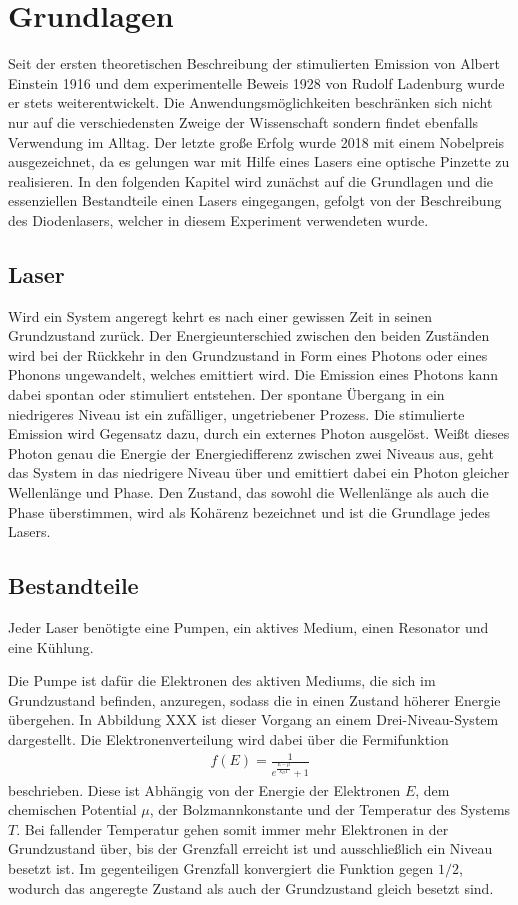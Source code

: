 \section{Grundlagen}
\label{sec:Grundlagen}
Seit der ersten theoretischen Beschreibung der stimulierten Emission von Albert Einstein 1916 und dem experimentelle Beweis 1928 von Rudolf Ladenburg wurde er stets weiterentwickelt. Die Anwendungsmöglichkeiten beschränken sich nicht nur auf die verschiedensten Zweige der Wissenschaft sondern findet ebenfalls Verwendung im Alltag. Der letzte große Erfolg wurde 2018 mit einem Nobelpreis ausgezeichnet, da es gelungen war mit Hilfe eines Lasers eine optische Pinzette zu realisieren.
In den folgenden Kapitel wird zunächst auf die Grundlagen und die essenziellen Bestandteile einen Lasers eingegangen, gefolgt von der Beschreibung des Diodenlasers, welcher in diesem Experiment verwendeten wurde.

\subsection{Laser}
Wird ein System angeregt kehrt es nach einer gewissen Zeit in seinen Grundzustand zurück. Der Energieunterschied zwischen den beiden Zuständen wird bei der Rückkehr in den Grundzustand in Form eines Photons oder eines Phonons ungewandelt, welches emittiert wird. Die Emission eines Photons kann dabei spontan oder stimuliert entstehen. Der spontane Übergang in ein niedrigeres Niveau ist ein zufälliger, ungetriebener Prozess. Die stimulierte Emission wird Gegensatz dazu, durch ein externes Photon ausgelöst. Weißt dieses Photon genau die Energie der Energiedifferenz zwischen zwei Niveaus aus, geht das System in das niedrigere Niveau über und emittiert dabei ein Photon gleicher Wellenlänge und Phase. Den Zustand, das sowohl die Wellenlänge als auch die Phase überstimmen, wird als Kohärenz bezeichnet und ist die Grundlage jedes Lasers.

\subsection{Bestandteile}
Jeder Laser benötigte eine Pumpen, ein aktives Medium, einen Resonator und eine Kühlung.

Die Pumpe ist dafür die Elektronen des aktiven Mediums, die sich im Grundzustand befinden, anzuregen, sodass die in einen Zustand höherer Energie übergehen. In Abbildung XXX ist dieser Vorgang an einem Drei-Niveau-System dargestellt. Die Elektronenverteilung wird dabei über die Fermifunktion
\begin{align}
	f(E)=\frac{1}{e^{\frac{E-\mu}{k_B T}}+1}
\end{align}
beschrieben. Diese ist Abhängig von der Energie der Elektronen $E$, dem chemischen Potential $\mu$, der Bolzmannkonstante und der Temperatur des Systems $T$. Bei fallender Temperatur gehen somit immer mehr Elektronen in der Grundzustand über, bis der Grenzfall erreicht ist und ausschließlich ein Niveau besetzt ist. Im gegenteiligen Grenzfall konvergiert die Funktion gegen $1/2$, wodurch das angeregte Zustand als auch der Grundzustand gleich besetzt sind. 

